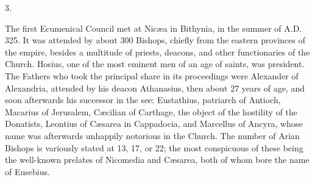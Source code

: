 3.

The first Ecumenical Council met at Nicæa in Bithynia, in the
summer of A.D. 325. It was attended by about 300
Bishops, chiefly from the eastern provinces of the empire, besides a
multitude of priests, deacons, and other functionaries of the Church.
Hosius, one of the most eminent men of an age of saints, was
president. The Fathers who took the principal share in its proceedings
were Alexander of Alexandria, attended by his deacon Athanasius, then
about 27 years of age, and soon afterwards his successor in the
see; Eustathius, patriarch of Antioch, Macarius of Jerusalem,
Cæcilian of Carthage, the object of the hostility of the Donatists,
Leontius of Cæsarea in Cappadocia, and Marcellus of Ancyra, whose
name was afterwards unhappily notorious in the Church. The number of
Arian Bishops is variously stated at 13, 17, or 22; the most
conspicuous of these being the well-known prelates of Nicomedia and
Cæsarea, both of whom bore the name of Eusebius.

